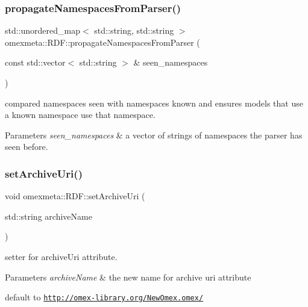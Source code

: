 \subsubsection{\texorpdfstring{propagate\+Namespaces\+From\+Parser()}{propagateNamespacesFromParser()}}
{\footnotesize\ttfamily std\+::unordered\+\_\+map$<$ std\+::string, std\+::string $>$ omexmeta\+::\+R\+D\+F\+::propagate\+Namespaces\+From\+Parser (\begin{DoxyParamCaption}\item[{const std\+::vector$<$ std\+::string $>$ \&}]{seen\+\_\+namespaces }\end{DoxyParamCaption})}



compared namespaces seen with namespaces known and ensures models that use a known namespace use that namespace. 


\begin{DoxyParams}{Parameters}
{\em seen\+\_\+namespaces} & a vector of strings of namespaces the parser has seen before. \\
\hline
\end{DoxyParams}
\mbox{\label{classomexmeta_1_1RDF_a77ba0cbdb6070ac78f14044197d79cd8}} 
\subsubsection{\texorpdfstring{set\+Archive\+Uri()}{setArchiveUri()}}
{\footnotesize\ttfamily void omexmeta\+::\+R\+D\+F\+::set\+Archive\+Uri (\begin{DoxyParamCaption}\item[{std\+::string}]{archive\+Name }\end{DoxyParamCaption})}



setter for archive\+Uri attribute. 


\begin{DoxyParams}{Parameters}
{\em archive\+Name} & the new name for archive uri attribute\\
\hline
\end{DoxyParams}
default to \href{http://omex-library.org/NewOmex.omex/}{\tt http\+://omex-\/library.\+org/\+New\+Omex.\+omex/} \mbox{\label{classomexmeta_1_1RDF_ad5310903d0e1a7a7ee890478f18b6181}} 
